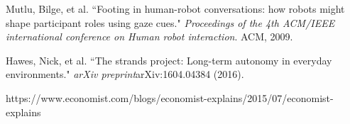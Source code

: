 \documentclass[letterpaper, 10 pt, conference]{ieeeconf}  %
\begin{document}
\begin{thebibliography}{99}
 Mutlu, Bilge, et al. ``Footing in human-robot conversations: how robots might shape participant roles using gaze cues." \textit{Proceedings of the 4th ACM/IEEE international conference on Human robot interaction}. ACM, 2009.


 Hawes, Nick, et al. ``The strands project: Long-term autonomy in everyday environments." \textit{arXiv preprint}arXiv:1604.04384 (2016).

 https://www.economist.com/blogs/economist-explains/2015/07/economist-explains 

\end{thebibliography}
\end{document}
